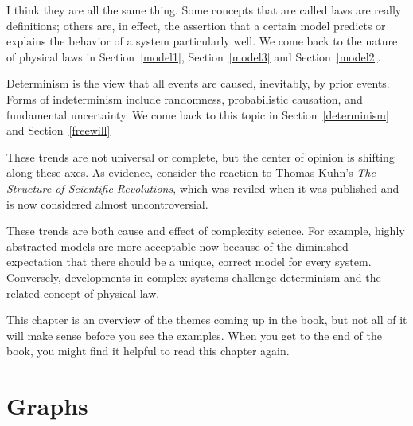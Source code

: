 \documentclass[12pt]{book}
\theoremstyle{exercise}
\newcommand{\myrightarrow}{\ensuremath \rightarrow}
\begin{document}
\begin{description}

  I think they are all the same thing.  Some concepts that are called
  laws are really definitions; others are, in effect, the
  assertion that a certain model predicts or explains the behavior of a system
  particularly well.  We come back to the nature of physical laws in
  Section~\ref{model1}, Section~\ref{model3} and Section~\ref{model2}.


\item[Determinism \myrightarrow~indeterminism] Determinism is the view
  that all events are caused, inevitably, by prior events.  Forms of
  indeterminism include randomness, probabilistic causation, and
  fundamental uncertainty.  We come back to this
  topic in Section~\ref{determinism} and Section~\ref{freewill}


\end{description}

These trends are not universal or complete, but the center of
opinion is shifting along these axes.  As evidence, consider the
reaction to Thomas Kuhn's {\em The Structure of Scientific
  Revolutions}, which was reviled when it was published and is
now considered almost uncontroversial.


These trends are both cause and effect of complexity science.  For
example, highly abstracted models are more acceptable now because of
the diminished expectation that there should be a unique, correct model
for every system.  Conversely, developments in complex systems
challenge determinism and the related concept of physical law.

This chapter is an overview of the themes coming up in the book, but
not all of it will make sense before you see the examples.  When you
get to the end of the book, you might find it helpful to read this
chapter again.


\chapter{Graphs}
\label{graphs}

\newcommand{\Erdos}{Erd\H{o}s}
\newcommand{\Renyi}{R\'{e}nyi}
\end{document}
